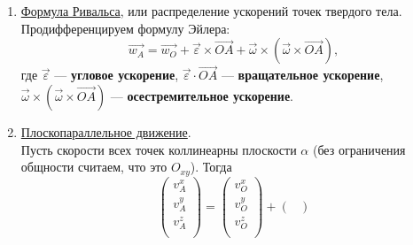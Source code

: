 \begin{corollary}
\begin{enumerate}
        Найдем точку B такую, что $\vec{v_O} = \vec{v}_{||}$.\\
        Очевидно, что $\vec{v_B} = \vec{v_O} + \vec{\omega}\times \vec{OB}$, $\vec{v_B}~ || ~\vec{\omega}$.
        \[
        \vec{OB} = \begin{pmatrix}
            x - x_O\\y - y_O\\z-z_O\\
        \end{pmatrix} \Longrightarrow  \begin{pmatrix}
            \omega_x\\ \omega_y \\ \omega_z
        \end{pmatrix} \times \begin{pmatrix}
            x - x_O\\y - y_O\\z - z_O\\
        \end{pmatrix} = const \Longrightarrow \text{получили уравнение прямой}
        \]
        Найти ускорение кинематического винта = найти ось винта и скоростью поступательного движения.
        \item \underline{Формула Ривальса}, или распределение ускорений точек твердого тела.\\
        Продифференцируем формулу Эйлера:
        \[
        \vec{w_A} = \vec{w_O} + \vec{\varepsilon} \times \vec{OA} + \vec{\omega} \times (\vec{\omega} \times \vec{OA}),
        \]
        где $\vec{\varepsilon}$ --- \textbf{угловое ускорение}, $\vec{\varepsilon} \cdot \vec{OA}$ --- \textbf{вращательное ускорение}, $\vec{\omega} \times (\vec{\omega} \times \vec{OA})$ --- \textbf{осестремительное ускорение}.
        \item \underline{Плоскопараллельное движение}.\\
        Пусть скорости всех точек коллинеарны плоскости $\alpha$ (без ограничения общности считаем, что это $O_{xy}$). Тогда
        \[
        \begin{pmatrix}
            v_A^x\\v_A^y\\v_A^z\\
        \end{pmatrix} = \begin{pmatrix}
            v_O^x\\v_O^y\\v_O^z\\
        \end{pmatrix} + \begin{pmatrix}

\end{pmatrix}\]
\end{enumerate}
\end{corollary}
